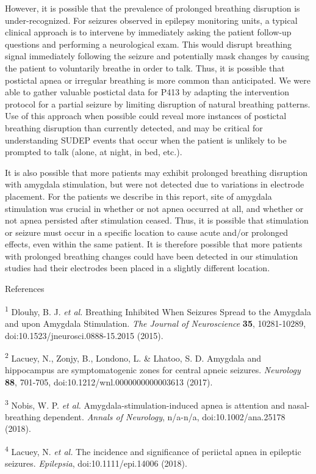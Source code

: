 \documentclass[]{article}
\begin{document}
However, it is possible that the prevalence of prolonged breathing
disruption is under-recognized. For seizures observed in epilepsy
monitoring units, a typical clinical approach is to intervene by
immediately asking the patient follow-up questions and performing a
neurological exam. This would disrupt breathing signal immediately
following the seizure and potentially mask changes by causing the
patient to voluntarily breathe in order to talk. Thus, it is possible
that postictal apnea or irregular breathing is more common than
anticipated. We were able to gather valuable postictal data for P413 by
adapting the intervention protocol for a partial seizure by limiting
disruption of natural breathing patterns. Use of this approach when
possible could reveal more instances of postictal breathing disruption
than currently detected, and may be critical for understanding SUDEP
events that occur when the patient is unlikely to be prompted to talk
(alone, at night, in bed, etc.).

It is also possible that more patients may exhibit prolonged breathing
disruption with amygdala stimulation, but were not detected due to
variations in electrode placement. For the patients we describe in this
report, site of amygdala stimulation was crucial in whether or not apnea
occurred at all, and whether or not apnea persisted after stimulation
ceased. Thus, it is possible that stimulation or seizure must occur in a
specific location to cause acute and/or prolonged effects, even within
the same patient. It is therefore possible that more patients with
prolonged breathing changes could have been detected in our stimulation
studies had their electrodes been placed in a slightly different
location.

References

\textsuperscript{1} Dlouhy, B. J. \emph{et al.} Breathing Inhibited When
Seizures Spread to the Amygdala and upon Amygdala Stimulation. \emph{The
Journal of Neuroscience} \textbf{35}, 10281-10289,
doi:10.1523/jneurosci.0888-15.2015 (2015).

\textsuperscript{2} Lacuey, N., Zonjy, B., Londono, L. \& Lhatoo, S. D.
Amygdala and hippocampus are symptomatogenic zones for central apneic
seizures. \emph{Neurology} \textbf{88}, 701-705,
doi:10.1212/wnl.0000000000003613 (2017).

\textsuperscript{3} Nobis, W. P. \emph{et al.}
Amygdala-stimulation-induced apnea is attention and nasal-breathing
dependent. \emph{Annals of Neurology}, n/a-n/a, doi:10.1002/ana.25178
(2018).

\textsuperscript{4} Lacuey, N. \emph{et al.} The incidence and
significance of periictal apnea in epileptic seizures. \emph{Epilepsia},
doi:10.1111/epi.14006 (2018).
\end{document}
